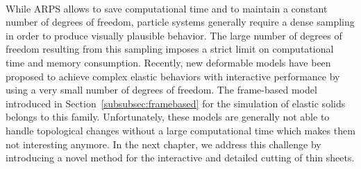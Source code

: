 \paragraph*{}
While ARPS allows to save computational time and to maintain a constant number of degrees of freedom,
particle systems generally require a dense sampling in order to produce visually plausible behavior.
The large number of degrees of freedom resulting from this sampling imposes a strict limit on computational time and memory consumption.
Recently, new deformable models have been proposed to achieve complex elastic behaviors with interactive performance by using a very small number of degrees of freedom. 
The frame-based model introduced in Section~\ref{subsubsec:framebased} for the simulation of elastic solids belongs to this family.
Unfortunately, these models are generally not able to handle topological changes without a large computational time which makes them not interesting anymore.
In the next chapter, we address this challenge by introducing a novel method for the interactive and detailed cutting of thin sheets.
